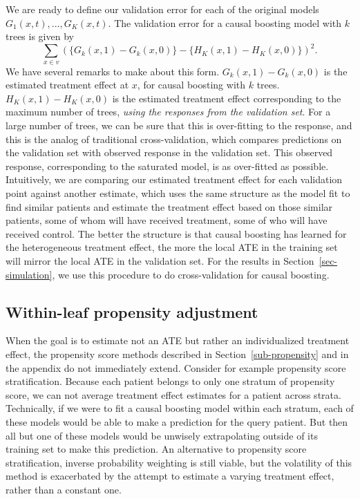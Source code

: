 \documentclass{article}
\def\l{\left}\def\r{\right}\def\lf{\lfloor}\def\rf{\rfloor}
\begin{document}
We are ready to define our validation error for each of the original models
$G_1(x, t), ..., G_K(x, t)$. The validation error for a causal boosting model
with $k$ trees is given by
$$\sum_{x \in v} \l(\{G_k(x, 1) - G_k(x, 0)\} -
  \{H_K(x, 1) - H_K(x, 0)\}\r)^2.$$
We have several remarks to make about this form. $G_k(x, 1) - G_k(x, 0)$
is the estimated treatment effect at $x$, for causal boosting with $k$ trees.
$H_K(x, 1) - H_K(x, 0)$ is the estimated treatment effect corresponding to the
maximum number of trees, {\it using the responses from the validation set}.
For a large number of trees, we can be sure that this is over-fitting to the
response, and this is the analog of traditional cross-validation, which
compares predictions on the validation set with observed response in the
validation set. This observed response, corresponding to the saturated model,
is as over-fitted as possible. Intuitively, we are comparing our estimated
treatment effect for each validation point against another estimate, which
uses the same structure as the model fit to find similar patients and estimate
the treatment effect based on those similar patients, some of whom will have
received treatment, some of who will have received control. The better the
structure is that
causal boosting has learned for the heterogeneous treatment effect, the more
the local ATE in the training set will mirror the local ATE in
the validation set. For the results in Section~\ref{sec-simulation}, we use
this procedure to do cross-validation for causal boosting.




\subsection{Within-leaf propensity adjustment}
\label{sub-adjustment}

When the goal is to estimate not an ATE but rather an individualized treatment
effect, the propensity score methods described in Section~\ref{sub-propensity}
and in the appendix do not immediately extend. Consider for example propensity
score stratification. Because each patient belongs to only one stratum of
propensity score, we can not average treatment effect estimates for a patient
across strata. Technically, if we were to fit a causal boosting model within
each stratum, each of these models would be able to make a prediction for the
query patient. But then all but one of these models would be unwisely
extrapolating outside of its training set to make this prediction.
An alternative to propensity score stratification, inverse probability
weighting is still viable, but the volatility of this
method is exacerbated by the attempt to estimate a varying treatment effect,
rather than a constant one.
\end{document}
